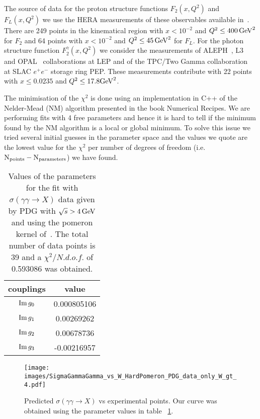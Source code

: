 \documentclass[preprint, 12pt]{elsarticle}
\begin{document}
The source of data for the proton structure functions $F_2\left(x, Q^2\right)$ and $F_L\left(x, Q^2\right)$ we use the HERA measurements of these observables available in~\cite{Aaron:2009aa, Collaboration:2010ry}. There are 249 points in the kinematical region with $x < 10^{-2}$ and $Q^2 \leq 400 {\rm \, GeV}^2$ for $F_2$ and 64 points with $x < 10^{-2}$ and $Q^2 \leq 45 {\rm \, GeV}^2$ for $F_L$. For the photon structure function $F_2^\gamma\left(x, Q^2\right)$ we consider the measurements of ALEPH~\cite{Heister:2003an}, L3~\cite{Acciarri:1998ig} and OPAL~\cite{Ackerstaff:1997ng, Abbiendi:2000cw, Abbiendi:2002te} collaborations at LEP and of the TPC/Two Gamma collaboration ~\cite{Aihara:1986xw} at SLAC $e^+e^-$ storage ring PEP. These measurements contribute with 22 points with $x \leq 0.0235$ and $Q^2 \leq 17.8 {\rm GeV}^2$.

The minimisation of the $\chi^2$ is done using an implementation in C++ of the Nelder-Mead (NM) algorithm presented in the book Numerical Recipes. We are performing fits with 4 free parameters and hence it is hard to tell if the minimum found by the NM algorithm is a local or global minimum. To solve this issue we tried several initial guesses in the parameter space and the values we quote are the lowest value for the $\chi^2$ per number of degrees of freedom (i.e. ${\rm N_{points} - N_{parameters}}$) we have found.

\begin{table}[b!]
\centering
\caption{Values of the parameters for the fit with $\sigma\left(\gamma \gamma \rightarrow X\right)$ data given by PDG with $\sqrt{s} > 4 {\rm \, GeV}$ and using the pomeron kernel of~\cite{gluonPDF_IHQCD_2020}. The total number of data points is 39 and a $\chi^2 / {N.d.o.f.}$ of 0.593086 was obtained.}
\vspace{0.5cm}
\begin{tabular}{|c|c|}
\hline
couplings   & value \\
\hline
${\rm Im} \, g_0$  & 0.000805106 \\ 
\hline
${\rm Im} \, g_1$  & 0.00269262 \\ 
\hline
${\rm Im} \, g_2$  & 0.00678736 \\ 
\hline
${\rm Im} \, g_3$  & -0.00216957 \\ 
\hline
\end{tabular}
\label{table:SigmaGammaGamma_best_fit_PDG_W_gt_4_HardPomeron}
\end{table}

\begin{figure}[!b]
\center
\texttt{[image: images/SigmaGammaGamma\_vs\_W\_HardPomeron\_PDG\_data\_only\_W\_gt\_4.pdf]} 
\caption{Predicted $\sigma\left(\gamma \gamma \rightarrow X\right)$ vs experimental points. Our curve was obtained using the parameter values in table ~\ref{table:SigmaGammaGamma_best_fit_PDG_W_gt_4_HardPomeron}.}
\label{fig:SigmaGammaGamma_best_fit_Sigma_data_only}
\end{figure}
\end{document}

